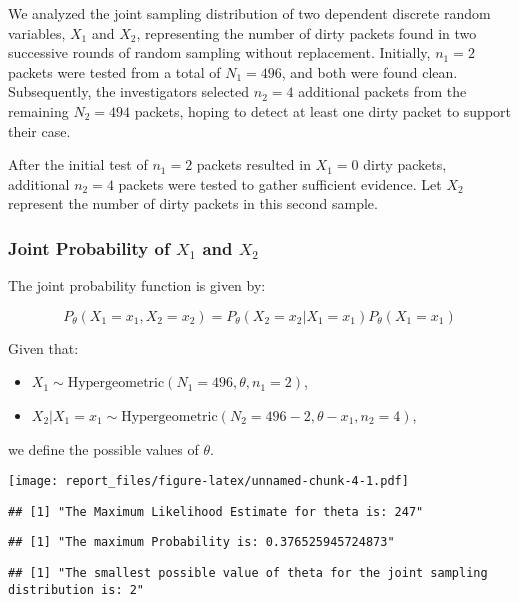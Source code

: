 \documentclass[
  14pt,
]{article}
\providecommand{\tightlist}{%
  \setlength{\itemsep}{0pt}\setlength{\parskip}{0pt}}
\begin{document}
We analyzed the joint sampling distribution of two dependent discrete
random variables, \(X_1\) and \(X_2\), representing the number of dirty
packets found in two successive rounds of random sampling without
replacement. Initially, \(n_1 = 2\) packets were tested from a total of
\(N_1 = 496\), and both were found clean. Subsequently, the
investigators selected \(n_2 = 4\) additional packets from the remaining
\(N_2 = 494\) packets, hoping to detect at least one dirty packet to
support their case.

After the initial test of \(n_1 = 2\) packets resulted in \(X_1 = 0\)
dirty packets, additional \(n_2 = 4\) packets were tested to gather
sufficient evidence. Let \(X_2\) represent the number of dirty packets
in this second sample.

\subsubsection{\texorpdfstring{Joint Probability of \(X_1\) and
\(X_2\)}{Joint Probability of X\_1 and X\_2}}\label{joint-probability-of-x_1-and-x_2}

The joint probability function is given by:

\[
P_{\theta}(X_1 = x_1, X_2 = x_2) = P_{\theta}(X_2 = x_2 | X_1 = x_1) P_{\theta}(X_1 = x_1)
\]

Given that:

\begin{itemize}
\tightlist
\item
  \(X_1 \sim \text{Hypergeometric}(N_1 = 496, \theta, n_1 = 2)\),
\item
  \(X_2 | X_1 = x_1 \sim \text{Hypergeometric}(N_2 = 496 - 2, \theta - x_1, n_2 = 4)\),
\end{itemize}

we define the possible values of \(\theta\).

\texttt{[image: report\_files/figure-latex/unnamed-chunk-4-1.pdf]}

\begin{verbatim}
## [1] "The Maximum Likelihood Estimate for theta is: 247"
\end{verbatim}

\begin{verbatim}
## [1] "The maximum Probability is: 0.376525945724873"
\end{verbatim}

\begin{verbatim}
## [1] "The smallest possible value of theta for the joint sampling distribution is: 2"
\end{verbatim}
\end{document}
